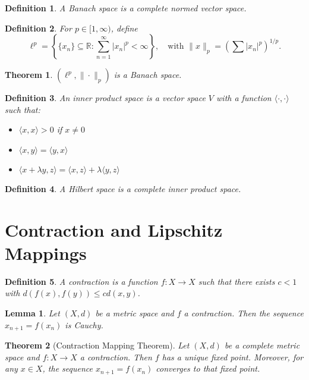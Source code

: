 \documentclass{article}
\newtheorem{theorem}{Theorem}
\newtheorem{definition}{Definition}
\newtheorem{lemma}{Lemma}
\begin{document}
\begin{definition}
A \emph{Banach space} is a complete normed vector space.
\end{definition}

\begin{definition}
For $p \in [1, \infty)$, define
\[
\ell^p = \left\{ \{x_n\} \subseteq \mathbb{R} : \sum_{n=1}^\infty |x_n|^p < \infty \right\},
\quad \text{with } \|x\|_p = \left( \sum |x_n|^p \right)^{1/p}.
\]
\end{definition}

\begin{theorem}
$(\ell^p, \|\cdot\|_p)$ is a Banach space.
\end{theorem}

\begin{definition}
An \emph{inner product space} is a vector space $V$ with a function $\langle \cdot, \cdot \rangle$ such that:
\begin{itemize}
  \item $\langle x, x \rangle > 0$ if $x \neq 0$
  \item $\langle x, y \rangle = \langle y, x \rangle$
  \item $\langle x + \lambda y, z \rangle = \langle x, z \rangle + \lambda \langle y, z \rangle$
\end{itemize}
\end{definition}

\begin{definition}
A \emph{Hilbert space} is a complete inner product space.
\end{definition}

\section*{Contraction and Lipschitz Mappings}

\begin{definition}
A \emph{contraction} is a function $f: X \to X$ such that there exists $c < 1$ with $d(f(x), f(y)) \leq c d(x, y)$.
\end{definition}

\begin{lemma}
Let $(X, d)$ be a metric space and $f$ a contraction. Then the sequence $x_{n+1} = f(x_n)$ is Cauchy.
\end{lemma}

\begin{theorem}[Contraction Mapping Theorem]
Let $(X, d)$ be a complete metric space and $f: X \to X$ a contraction. Then $f$ has a unique fixed point. Moreover, for any $x \in X$, the sequence $x_{n+1} = f(x_n)$ converges to that fixed point.
\end{theorem}
\end{document}
